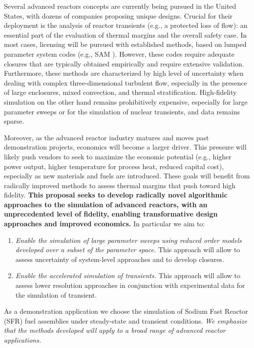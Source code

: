 Several  advanced reactors concepts are currently being pursued in the United
States, with dozens of companies proposing unique designs. Crucial for their
deployment is the analysis of  reactor transients (e.g., a protected loss of
flow): an essential part of the evaluation of thermal margins and the overall
safety case.  In most cases, licensing will be pursued with established
methods, based on lumped parameter system codes (e.g., SAM \cite{hu2021}).
However, these codes require adequate closures that are typically obtained
empirically and require extensive validation. Furthermore, these methods are
characterized by high level of uncertainty when dealing with complex
three-dimensional turbulent flow, especially in the presence of large
enclosures, mixed convection, and thermal stratification. High-fidelity
simulation on the other hand remains prohibitively expensive, especially for
large parameter sweeps or for the simulation of nuclear transients, and data
remains sparse.

Moreover, as the advanced reactor industry matures and moves past demonstration
projects, economics will become a larger driver. This pressure will likely push
vendors to seek to maximize the economic potential (e.g., higher power output,
higher temperature for process heat, reduced capital cost), especially as new
materials and fuels are introduced. These goals will benefit from radically
improved methods to assess thermal margins that push toward high fidelity.
\textbf{This proposal seeks to develop radically novel algorithmic approaches
to the simulation of advanced reactors, with an unprecedented level of
fidelity, enabling transformative design approaches and improved economics.} 
In particular we aim to: 
\begin{enumerate}
%
   \item \textit{Enable the simulation of large parameter sweeps using reduced
   order models developed over a subset of the parameter space.} This approach
   will allow to assess uncertainty of system-level approaches and to develop
   closures.
%
   \item \textit{Enable the accelerated simulation of transients.}
   This approach will allow to assess lower resolution approaches in conjunction
   with experimental data for the simulation of transient.  
\end{enumerate}
As a demonstration application we choose the simulation of Sodium Fast Reactor
(SFR) fuel assemblies under steady-state and transient conditions. \textit{We
emphasize that the methods developed will apply to a broad range of advanced
reactor applications.}

